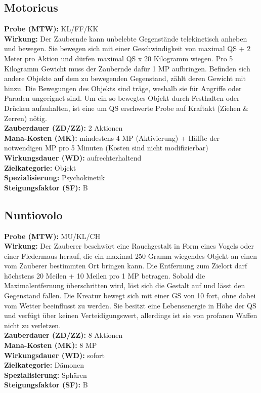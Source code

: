 \subsection{Motoricus}
\label{chap:motoricus}
\textbf{Probe (MTW):} KL/FF/KK \\
\textbf{Wirkung:} Der Zaubernde kann unbelebte Gegenstände telekinetisch anheben und bewegen. Sie bewegen sich mit einer Geschwindigkeit von maximal QS + 2 Meter pro Aktion und dürfen maximal QS x 20 Kilogramm wiegen. Pro 5 Kilogramm Gewicht muss der Zaubernde dafür 1 MP aufbringen. Befinden sich andere Objekte auf dem zu bewegenden Gegenstand, zählt deren Gewicht mit hinzu. Die Bewegungen des Objekts sind träge, weshalb sie für Angriffe oder Paraden ungeeignet sind. Um ein so bewegtes Objekt durch Festhalten oder Drücken aufzuhalten, ist eine um QS erschwerte Probe auf Kraftakt (Ziehen \& Zerren) nötig.\\
\textbf{Zauberdauer (ZD/ZZ):} 2 Aktionen \\
\textbf{Mana-Kosten (MK):} mindestens 4 MP (Aktivierung) + Hälfte der notwendigen MP pro 5 Minuten (Kosten sind nicht modifizierbar) \\
\textbf{Wirkungsdauer (WD):} aufrechterhaltend \\
\textbf{Zielkategorie:} Objekt \\
\textbf{Spezialisierung:} Psychokinetik \\
\textbf{Steigungsfaktor (SF):} B


\subsection{Nuntiovolo}
\label{chap:nuntiovolo}
\textbf{Probe (MTW):} MU/KL/CH \\
\textbf{Wirkung:} Der Zauberer beschwört eine Rauchgestalt in Form eines Vogels oder einer Fledermaus herauf, die ein maximal 250 Gramm wiegendes Objekt an einen vom Zauberer bestimmten Ort bringen kann. Die Entfernung zum Zielort darf höchstens 20 Meilen + 10 Meilen pro 1 MP betragen. Sobald die Maximalentfernung überschritten wird, löst sich die Gestalt auf und lässt den Gegenstand fallen. Die Kreatur bewegt sich mit einer GS von 10 fort, ohne dabei vom Wetter beeinflusst zu werden. Sie besitzt eine Lebensenergie in Höhe der QS und verfügt über keinen Verteidigungswert, allerdings ist sie von profanen Waffen nicht zu verletzen.\\
\textbf{Zauberdauer (ZD/ZZ):} 8 Aktionen \\
\textbf{Mana-Kosten (MK):} 8 MP \\
\textbf{Wirkungsdauer (WD):} sofort \\
\textbf{Zielkategorie:} Dämonen \\
\textbf{Spezialisierung:} Sphären \\
\textbf{Steigungsfaktor (SF):} B


